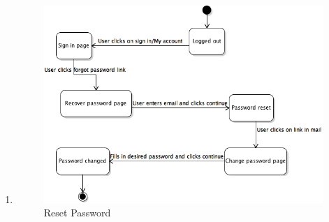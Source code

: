 \documentclass[UKenglish,12pt]{article}
\begin{document}
\begin{enumerate}
\item
\begin{figure}[H]
\centering
\includegraphics[scale=0.7,keepaspectratio]{Images/ResetPassword.png}
\caption{Reset Password}
\end{figure}


\end{enumerate}
\end{document}
